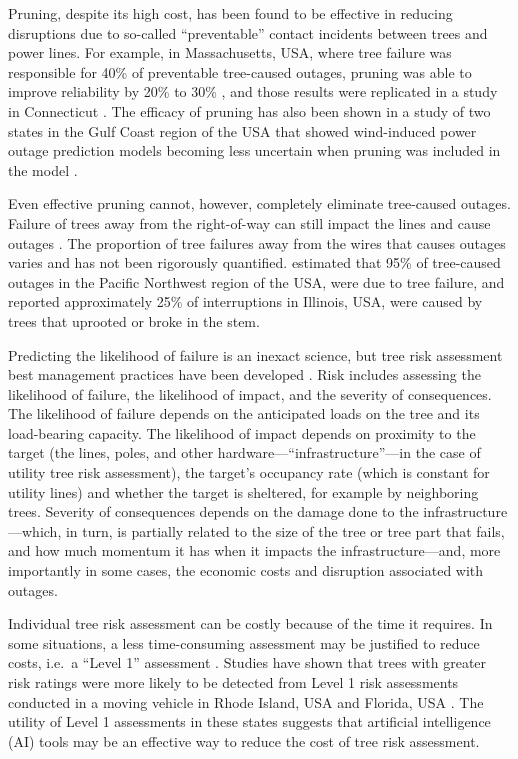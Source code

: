 \documentclass[Journal, letterpaper]{ascelike-new}
\newcommand{\?}{\stackrel{?}{=}}
\begin{document}
Pruning, despite its high cost, has been found to be effective in reducing disruptions due to so-called ``preventable'' contact incidents between trees and power lines.  For example, in Massachusetts, USA, where tree failure was responsible for 40\% of preventable tree-caused outages, pruning was able to improve reliability by 20\% to 30\% \cite{simpson1996treecaused}, and those results were replicated in a study in Connecticut \cite{parent2019analysis}. The efficacy of pruning has also been shown in a study of two states in the Gulf Coast region of the USA that showed wind-induced power outage prediction models becoming less uncertain when pruning was included in the model .

Even effective pruning cannot, however, completely eliminate tree-caused outages. Failure of trees away from the right-of-way can still impact the lines and cause outages \cite{guggenmoos2003effects}. The proportion of tree failures away from the wires that causes outages varies and has not been rigorously quantified.  estimated that 95\% of tree-caused outages in the Pacific Northwest region of the USA, were due to tree failure, and  reported approximately 25\% of interruptions in Illinois, USA, were caused by trees that uprooted or broke in the stem. 


Predicting the likelihood of failure is an inexact science, but tree risk assessment best management practices have been developed \cite{e.thomassmiley2017best,johnw.goodfellow2020best}. Risk includes assessing the likelihood of failure, the likelihood of impact, and the severity of consequences. The likelihood of failure depends on the anticipated loads on the tree and its load-bearing capacity. The likelihood of impact depends on proximity to the target (the lines, poles, and other hardware---``infrastructure''---in the case of utility tree risk assessment), the target’s occupancy rate (which is constant for utility lines) and whether the target is sheltered, for example by neighboring trees. Severity of consequences depends on the damage done to the infrastructure---which, in turn, is partially related to the size of the tree or tree part that fails, and how much momentum it has when it impacts the infrastructure---and, more importantly in some cases, the economic costs and disruption associated with outages.

Individual tree risk assessment can be costly because of the time it requires. In some situations, a less time-consuming assessment may be justified to reduce costs, i.e.\ a ``Level 1'' assessment  \cite{e.thomassmiley2017best}. Studies have shown that trees with greater risk ratings were more likely to be detected from Level 1 risk assessments conducted in a moving vehicle in Rhode Island, USA \cite{rooney2005reliability} and Florida, USA \cite{koeser2016frequency}. The utility of Level 1 assessments in these states suggests that artificial intelligence (AI) tools may be an effective way to reduce the cost of tree risk assessment.
\end{document}
